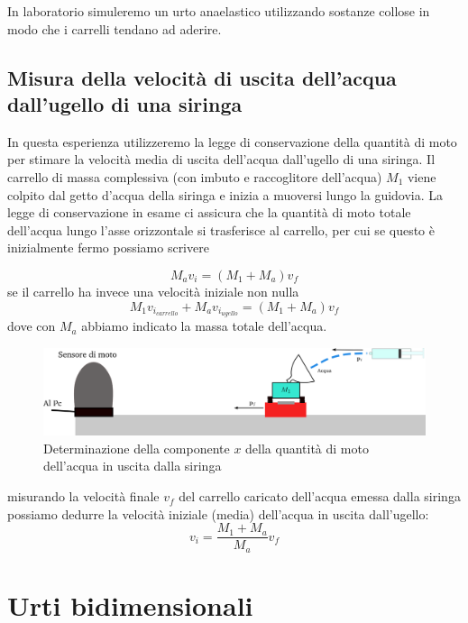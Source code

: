 \documentclass[a4paper,10pt,oneside]{article}
\begin{document}
In laboratorio simuleremo un urto anaelastico  utilizzando sostanze collose in modo che i carrelli tendano ad aderire.

\subsection*{Misura della velocità di uscita dell'acqua dall'ugello di una siringa}

In questa esperienza utilizzeremo la legge di conservazione della quantità di moto per stimare la velocità media di uscita dell'acqua dall'ugello di una siringa. Il carrello di massa complessiva (con imbuto e raccoglitore dell'acqua) $M_1$ viene colpito dal getto d'acqua della siringa e inizia a muoversi lungo la guidovia. La legge di conservazione in esame ci assicura che la quantità di moto totale dell'acqua lungo l'asse orizzontale si trasferisce al carrello,  per cui se questo è inizialmente fermo possiamo scrivere

\begin{equation}
M_av_{i}=(M_1+M_a)v_f
\end{equation}
se il carrello ha invece una velocità iniziale non nulla 
\begin{equation}
 M_1v_{i_{carrello}}+M_av_{i_{ugello}}=(M_1+M_a)v_f
\end{equation}
dove con $M_a$ abbiamo indicato la massa totale dell'acqua.


\begin{figure}[H]
 \centering
 \includegraphics[width=\textwidth]{./immagini/imbuto.png}
 \caption{Determinazione della componente $x$ della quantità di moto dell'acqua in uscita dalla siringa}
 \label{fig:imbuto_siringa}
\end{figure}
misurando la velocità finale $v_f$ del carrello caricato dell'acqua emessa dalla siringa possiamo dedurre la velocità iniziale (media) dell'acqua in uscita dall'ugello:
\begin{equation}
 v_i=\frac{M_1+M_a}{M_a}v_f
\end{equation}

\section*{Urti bidimensionali}
\end{document}
